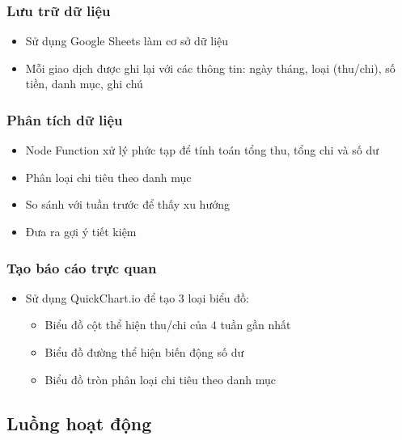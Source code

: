 \subsubsection{Lưu trữ dữ liệu}
\begin{itemize}
    \item Sử dụng Google Sheets làm cơ sở dữ liệu
    \item Mỗi giao dịch được ghi lại với các thông tin: ngày tháng, loại (thu/chi), số tiền, danh mục, ghi chú
\end{itemize}

\subsubsection{Phân tích dữ liệu}
\begin{itemize}
    \item Node Function xử lý phức tạp để tính toán tổng thu, tổng chi và số dư
    \item Phân loại chi tiêu theo danh mục
    \item So sánh với tuần trước để thấy xu hướng
    \item Đưa ra gợi ý tiết kiệm
\end{itemize}

\subsubsection{Tạo báo cáo trực quan}
\begin{itemize}
    \item Sử dụng QuickChart.io để tạo 3 loại biểu đồ:
    \begin{itemize}
        \item Biểu đồ cột thể hiện thu/chi của 4 tuần gần nhất
        \item Biểu đồ đường thể hiện biến động số dư
        \item Biểu đồ tròn phân loại chi tiêu theo danh mục
    \end{itemize}
\end{itemize}

\subsection{Luồng hoạt động}

